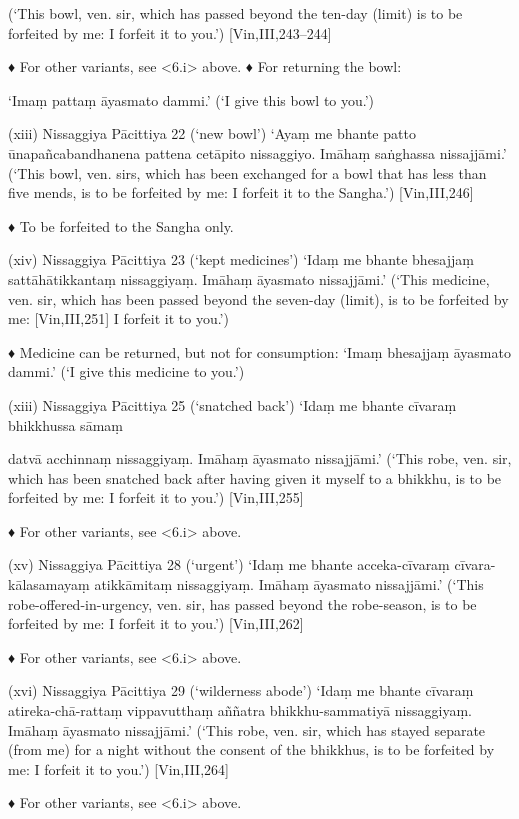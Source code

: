 (‘This bowl, ven. sir, which has passed beyond the
ten-day (limit) is to be forfeited by me:
I forfeit it to you.’)
[Vin,III,243–244]

♦ For other variants, see <6.i> above.
♦ For returning the bowl:

‘Imaṃ pattaṃ āyasmato dammi.’
(‘I give this bowl to you.’)

(xiii) Nissaggiya Pācittiya 22 (‘new bowl’)
‘Ayaṃ me bhante patto ūnapañcabandhanena pattena cetāpito nissaggiyo.
Imāhaṃ saṅghassa nissajjāmi.’
(‘This bowl, ven. sirs, which has been exchanged for
a bowl that has less than five mends, is to be forfeited
by me: I forfeit it to the Sangha.’)
[Vin,III,246]

♦ To be forfeited to the Sangha only.

(xiv) Nissaggiya Pācittiya 23 (‘kept medicines’)
‘Idaṃ me bhante bhesajjaṃ sattāhātikkantaṃ
nissaggiyaṃ. Imāhaṃ āyasmato nissajjāmi.’
(‘This medicine, ven. sir, which has been passed
beyond the seven-day (limit), is to be forfeited by me:
[Vin,III,251]
I forfeit it to you.’)

♦ Medicine can be returned, but not for consumption:
‘Imaṃ bhesajjaṃ āyasmato dammi.’
(‘I give this medicine to you.’)

(xiii) Nissaggiya Pācittiya 25 (‘snatched back’)
‘Idaṃ me bhante cīvaraṃ bhikkhussa sāmaṃ

datvā acchinnaṃ nissaggiyaṃ.
Imāhaṃ āyasmato nissajjāmi.’
(‘This robe, ven. sir, which has been snatched back
after having given it myself to a bhikkhu, is to be
forfeited by me: I forfeit it to you.’) [Vin,III,255]

♦ For other variants, see <6.i> above.

(xv) Nissaggiya Pācittiya 28 (‘urgent’)
‘Idaṃ me bhante acceka-cīvaraṃ cīvara-kālasamayaṃ atikkāmitaṃ nissaggiyaṃ.
Imāhaṃ āyasmato nissajjāmi.’
(‘This robe-offered-in-urgency, ven. sir, has passed
beyond the robe-season, is to be forfeited by me: I
forfeit it to you.’)
[Vin,III,262]

♦ For other variants, see <6.i> above.

(xvi) Nissaggiya Pācittiya 29 (‘wilderness abode’)
‘Idaṃ me bhante cīvaraṃ atireka-chā-rattaṃ
vippavutthaṃ aññatra bhikkhu-sammatiyā
nissaggiyaṃ. Imāhaṃ āyasmato nissajjāmi.’
(‘This robe, ven. sir, which has stayed separate (from
me) for a night without the consent of the bhikkhus,
is to be forfeited by me: I forfeit it to you.’) [Vin,III,264]

♦ For other variants, see <6.i> above.

